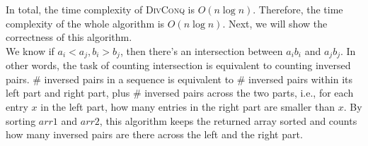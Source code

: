 \documentclass[11pt,twoside]{article}
\newenvironment{solution}{{\par\noindent\it Solution.}}{}
\begin{document}
\begin{solution}
In total, the time complexity of \textsc{DivConq} is $O(n\log{n})$. 
Therefore, the time complexity of the whole algorithm is $O(n\log{n})$.
Next, we will show the correctness of this algorithm.\\
We know if $a_i<a_j, b_i>b_j$, then there's an intersection between $a_i b_i$ and $a_j b_j$. 
In other words, the task of counting intersection is equivalent to counting inversed pairs.
\# inversed pairs in a sequence is equivalent to \# inversed pairs within its left part and right part,
plus \# inversed pairs across the two parts, i.e., for each entry $x$ in the left part, 
how many entries in the right part are smaller than $x$. 
By sorting $arr1$ and $arr2$, this algorithm keeps the returned array sorted and counts how many inversed pairs are there across the left and the right part.

\end{solution}
\end{document}
